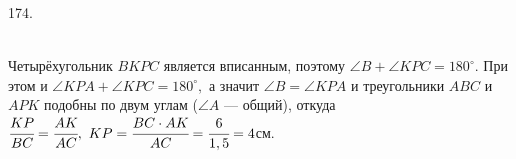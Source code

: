 174. \begin{figure}[ht!]
\end{figure}\\
Четырёхугольник $BKPC$ является вписанным, поэтому $\angle B+\angle KPC=180^\circ.$ При этом и $\angle KPA+\angle KPC=180^\circ,$ а значит $\angle B=\angle KPA$ и треугольники $ABC$ и $APK$ подобны по двум углам ($\angle A$ --- общий), откуда $\cfrac{KP}{BC}=\cfrac{AK}{AC},\ KP=\cfrac{BC\cdot AK}{AC}=\cfrac{6}{1,5}=4$см.\\
